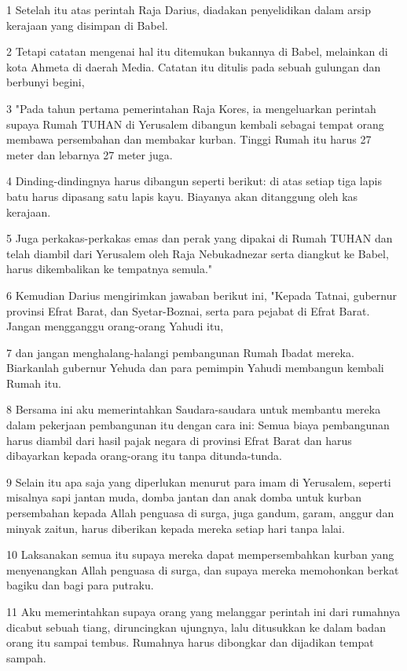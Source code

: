 \par 1 Setelah itu atas perintah Raja Darius, diadakan penyelidikan dalam arsip kerajaan yang disimpan di Babel.
\par 2 Tetapi catatan mengenai hal itu ditemukan bukannya di Babel, melainkan di kota Ahmeta di daerah Media. Catatan itu ditulis pada sebuah gulungan dan berbunyi begini,
\par 3 "Pada tahun pertama pemerintahan Raja Kores, ia mengeluarkan perintah supaya Rumah TUHAN di Yerusalem dibangun kembali sebagai tempat orang membawa persembahan dan membakar kurban. Tinggi Rumah itu harus 27 meter dan lebarnya 27 meter juga.
\par 4 Dinding-dindingnya harus dibangun seperti berikut: di atas setiap tiga lapis batu harus dipasang satu lapis kayu. Biayanya akan ditanggung oleh kas kerajaan.
\par 5 Juga perkakas-perkakas emas dan perak yang dipakai di Rumah TUHAN dan telah diambil dari Yerusalem oleh Raja Nebukadnezar serta diangkut ke Babel, harus dikembalikan ke tempatnya semula."
\par 6 Kemudian Darius mengirimkan jawaban berikut ini, "Kepada Tatnai, gubernur provinsi Efrat Barat, dan Syetar-Boznai, serta para pejabat di Efrat Barat. Jangan mengganggu orang-orang Yahudi itu,
\par 7 dan jangan menghalang-halangi pembangunan Rumah Ibadat mereka. Biarkanlah gubernur Yehuda dan para pemimpin Yahudi membangun kembali Rumah itu.
\par 8 Bersama ini aku memerintahkan Saudara-saudara untuk membantu mereka dalam pekerjaan pembangunan itu dengan cara ini: Semua biaya pembangunan harus diambil dari hasil pajak negara di provinsi Efrat Barat dan harus dibayarkan kepada orang-orang itu tanpa ditunda-tunda.
\par 9 Selain itu apa saja yang diperlukan menurut para imam di Yerusalem, seperti misalnya sapi jantan muda, domba jantan dan anak domba untuk kurban persembahan kepada Allah penguasa di surga, juga gandum, garam, anggur dan minyak zaitun, harus diberikan kepada mereka setiap hari tanpa lalai.
\par 10 Laksanakan semua itu supaya mereka dapat mempersembahkan kurban yang menyenangkan Allah penguasa di surga, dan supaya mereka memohonkan berkat bagiku dan bagi para putraku.
\par 11 Aku memerintahkan supaya orang yang melanggar perintah ini dari rumahnya dicabut sebuah tiang, diruncingkan ujungnya, lalu ditusukkan ke dalam badan orang itu sampai tembus. Rumahnya harus dibongkar dan dijadikan tempat sampah.

